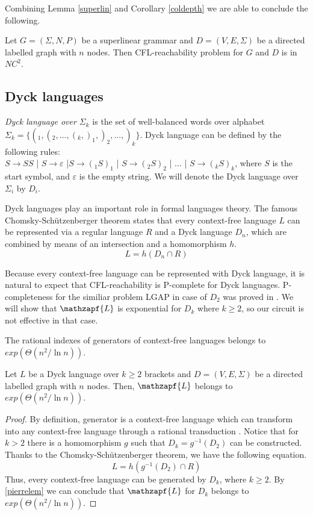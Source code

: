 Combining Lemma \ref{superlin} and Corollary \ref{coldepth} we are able to conclude the following.
\begin{corollary} 
Let  $G = (\Sigma, N, P)$ be a superlinear grammar and $D=(V, E, \Sigma)$ be a directed labelled graph with $n$ nodes. Then CFL-reachability problem for $G$ and $D$ is in $NC^2$.
\end{corollary}

\subsection{Dyck languages}
\textit{Dyck language over $\Sigma_k$} is the set of well-balanced words over alphabet $\Sigma_k = \{(_1, (_2, ..., (_k, )_1, )_2, ..., )_k\}$. Dyck language can be defined by the following rules:
\\$S \rightarrow SS$ | $S \rightarrow \varepsilon$ |$S \rightarrow (_1S)_1$ | $S \rightarrow (_2S)_2$ | ... | $S \rightarrow (_kS)_k$, where $S$ is the start symbol, and $\varepsilon$ is the empty string. We will denote the Dyck language over $\Sigma_i$ by $D_i$.


Dyck languages play an important role in formal languages theory. The famous Chomsky-Sch\"utzenberger theorem states that every context-free language $L$ can be represented via a regular language $R$ and a Dyck language $D_n$, which are combined by means of an intersection and a homomorphism $h$. 
\begin{equation}
L = h(D_n \cap R)
\end{equation}


Because every context-free language can be represented with Dyck language, it is natural to expect that CFL-reachability is P-complete for Dyck languages. P-completeness for the similiar problem LGAP in case of $D_2$ was proved in \cite*{PCompl, LReach, Regularrealizability}. We will show that $\mathzapf{L}$ is exponential for $D_k$ where $k\ge2$, so our circuit is not effective in that case.
\begin{lemma}[Pierre]
\label{pierrelem}
The rational indexes of generators of context-free languages belongs to $exp(\Theta(n^2/\ln n))$.
\end{lemma}
\begin{theorem}
Let $L$ be a Dyck language over $k \ge 2$ brackets and $D=(V, E, \Sigma)$ be a directed labelled graph with $n$ nodes. Then, $\mathzapf{L}$  belongs to $exp(\Theta(n^2/\ln n))$.
\end{theorem}
\begin{proof}
By definition, generator is a context-free language which can transform into any context-free language through a rational transduction \cite{CFRat}.
Notice that for $k>2$ there is a homomorphism $g$ such that $D_k = g^{-1}(D_2)$ can be constructed. Thanks to the Chomsky-Sch\"utzenberger theorem, we have the following equation.
\begin{equation}
L = h(g^{-1}(D_2)\cap R)
\end{equation}
Thus, every context-free language can be generated by $D_k$, where $k \ge 2$. By \ref{pierrelem} we can conclude that $\mathzapf{L}$ for $D_k$ belongs to $exp(\Theta(n^2/\ln n))$. 
\end{proof}


